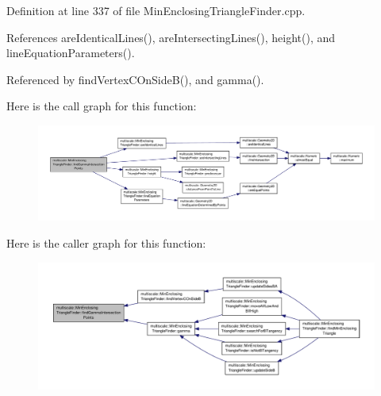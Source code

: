 Definition at line 337 of file Min\-Enclosing\-Triangle\-Finder.\-cpp.



References are\-Identical\-Lines(), are\-Intersecting\-Lines(), height(), and line\-Equation\-Parameters().



Referenced by find\-Vertex\-C\-On\-Side\-B(), and gamma().



Here is the call graph for this function\-:\nopagebreak
\begin{figure}[H]
\begin{center}
\leavevmode
\includegraphics[width=350pt]{classmultiscale_1_1MinEnclosingTriangleFinder_a9eedc43ea3190d8ee6343879dc100edb_cgraph}
\end{center}
\end{figure}




Here is the caller graph for this function\-:\nopagebreak
\begin{figure}[H]
\begin{center}
\leavevmode
\includegraphics[width=350pt]{classmultiscale_1_1MinEnclosingTriangleFinder_a9eedc43ea3190d8ee6343879dc100edb_icgraph}
\end{center}
\end{figure}


